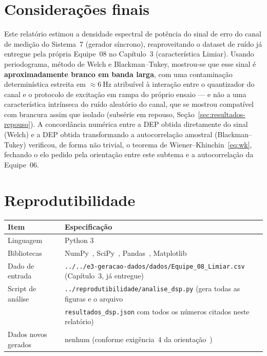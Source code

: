 \section{Considerações finais}
\label{sec:conclusao}

Este relatório estimou a densidade espectral de potência do sinal de erro do canal de medição do
Sistema~7 (gerador síncrono), reaproveitando o dataset de ruído já entregue pela própria
Equipe~08 no Capítulo~3 (característica Limiar). Usando periodograma, método de Welch e
Blackman--Tukey, mostrou-se que esse sinal é \textbf{aproximadamente branco em banda larga}, com
uma contaminação determinística estreita em $\approx\!6\ \text{Hz}$ atribuível à interação entre
o quantizador do canal e o protocolo de excitação em rampa do próprio ensaio --- e não a uma
característica intrínseca do ruído aleatório do canal, que se mostrou compatível com brancura
assim que isolado (subsérie em repouso, Seção~\ref{sec:resultados-repouso}). A concordância
numérica entre a DEP obtida diretamente do sinal (Welch) e a DEP obtida transformando a
autocorrelação amostral (Blackman--Tukey) verificou, de forma não trivial, o teorema de
Wiener--Khinchin~\eqref{eq:wk}, fechando o elo pedido pela orientação entre este subtema e a
autocorrelação da Equipe~06.

\appendix
\section{Reprodutibilidade}
\label{ap:repro}

\begin{center}\small
\begin{tabular}{@{}ll@{}}
\toprule
\textbf{Item} & \textbf{Especificação}\\
\midrule
Linguagem & Python 3\\
Bibliotecas & NumPy~\cite{numpy2020}, SciPy~\cite{scipy2020}, Pandas~\cite{mckinney2010},
  Matplotlib~\cite{matplotlib2007}\\
Dado de entrada & \texttt{../../e3-geracao-dados/dados/Equipe\_08\_Limiar.csv} (Capítulo~3, já
  entregue)\\
Script de análise & \texttt{../reprodutibilidade/analise\_dsp.py} (gera todas as figuras e o
  arquivo\\
  & \texttt{resultados\_dsp.json} com todos os números citados neste relatório)\\
Dados novos gerados & nenhum (conforme exigência~4 da orientação~\cite{orientacaocap5})\\
\bottomrule
\end{tabular}
\end{center}



